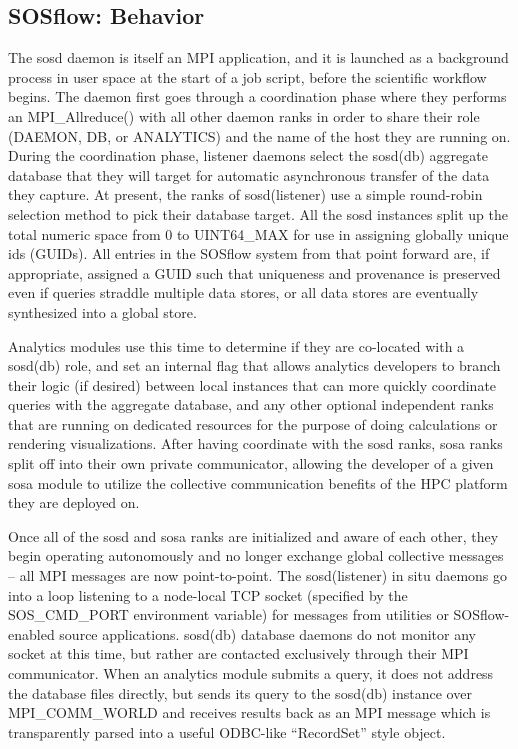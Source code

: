 \subsection{SOSflow: Behavior}
The sosd daemon is itself an MPI application, and it is launched as a
background process in user space at the start of a job script, before
the scientific workflow begins.  The daemon first goes through a
coordination phase where they performs an MPI\_Allreduce() with all
other daemon ranks in order to share their role (DAEMON, DB, or
ANALYTICS) and the name of the host they are running on. During the
coordination phase, listener daemons select the sosd(db) aggregate
database that they will target for automatic asynchronous transfer of
the data they capture. At present, the ranks of sosd(listener) use a
simple round-robin selection method to pick their database target. All
the sosd instances split up the total numeric space from 0 to
UINT64\_MAX for use in assigning globally unique ids (GUIDs). All
entries in the SOSflow system from that point forward are, if
appropriate, assigned a GUID such that uniqueness and provenance is
preserved even if queries straddle multiple data stores, or all data
stores are eventually synthesized into a global store.

Analytics modules use this time to determine if they are co-located
with a sosd(db) role, and set an internal flag that allows analytics
developers to branch their logic (if desired) between local instances that
can more quickly coordinate queries with the aggregate database, and any 
other optional independent ranks that are running on dedicated resources
for the purpose of doing calculations or rendering visualizations. After
having coordinate with the sosd ranks, sosa ranks split off into their own
private communicator, allowing the developer of a given sosa module to
utilize the collective communication benefits of the HPC platform they
are deployed on.

Once all of the sosd and sosa ranks are initialized and aware of each
other, they begin operating autonomously and no longer exchange global
collective messages -- all MPI messages are now point-to-point. The
sosd(listener) in situ daemons go into a loop listening to a
node-local TCP socket (specified by the SOS\_CMD\_PORT environment
variable) for messages from utilities or SOSflow-enabled source
applications.  sosd(db) database daemons do not monitor any socket at
this time, but rather are contacted exclusively through their MPI
communicator. When an analytics module submits a query, it does not
address the database files directly, but sends its query to the
sosd(db) instance over MPI\_COMM\_WORLD and receives results back as
an MPI message which is transparently parsed into a useful ODBC-like
``RecordSet'' style object.

